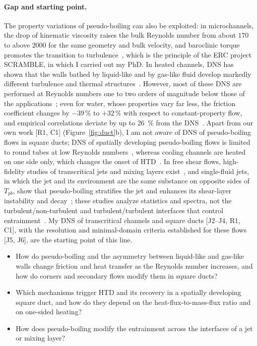 \documentclass[11pt]{article}
\begin{document}
\paragraph{Gap and starting point.} The property variations of pseudo-boiling can also be
exploited: in microchannels, the drop of kinematic viscosity raises the bulk Reynolds number from
about $170$ to above $2000$ for the same geometry and bulk velocity, and baroclinic torque
promotes the transition to turbulence~\cite{Hurtan2025,Bernades2023,Bernades2025}, which is the
principle of the ERC project SCRAMBLE, in which I carried out my PhD. In heated channels, DNS has
shown that the walls bathed by liquid-like and by gas-like fluid develop markedly different
turbulence and thermal structures~\cite{Ma2018,Guo2022,ElMansy2025,Kawai2019}. However, most
of these DNS are performed at Reynolds numbers one to two orders of magnitude below those of the
applications~\cite{Li2025}; even for water, whose properties vary far less, the friction
coefficient changes by $-39\,\%$ to $+32\,\%$ with respect to constant-property flow, and
empirical correlations deviate by up to 26~\% from the DNS~\cite{Modesti2026}. Apart from our own
work [R1, C1] (Figure~\ref{fig:duct}b), I am not aware of DNS of pseudo-boiling flows in square
ducts; DNS of spatially developing pseudo-boiling flows is limited to round tubes at low Reynolds
numbers~\cite{Bae2005,Zhao2021}, whereas cooling channels are heated on one side only, which
changes the onset of HTD~\cite{Nasuti2021}. In free shear flows, high-fidelity studies of
transcritical jets and mixing layers exist~\cite{Ries2017,SharanBellan2021,PobladorIbanez2026,Cavalieri2026},
and single-fluid jets, in which the jet and its environment are the same substance on opposite
sides of $T_{pb}$, show that pseudo-boiling stratifies the jet and enhances its shear-layer
instability and decay~\cite{Lapenna2019,Ream2025}; these studies analyze statistics and spectra,
not the turbulent/non-turbulent and turbulent/turbulent interfaces that control
entrainment~\cite{Silva2018,Alves2025}.  My DNS of transcritical channels and square ducts [J2--J4, R1, C1], with the resolution
and minimal-domain criteria established for these flows [J5, J6], are the starting point of this
line.
\begin{itemize}
  \item[\textbf{Q1.1}] How do pseudo-boiling and the asymmetry between liquid-like and
  gas-like walls change friction and heat transfer as the Reynolds number increases, and
  how do corners and secondary flows modify them in square ducts?
  \item[\textbf{Q1.2}] Which mechanisms trigger HTD and its recovery in a spatially developing
  square duct, and how do they depend on the heat-flux-to-mass-flux ratio and on one-sided
  heating?
  \item[\textbf{Q1.3}] How does pseudo-boiling modify the entrainment across the interfaces
  of a jet or mixing layer?
\end{itemize}
\end{document}
